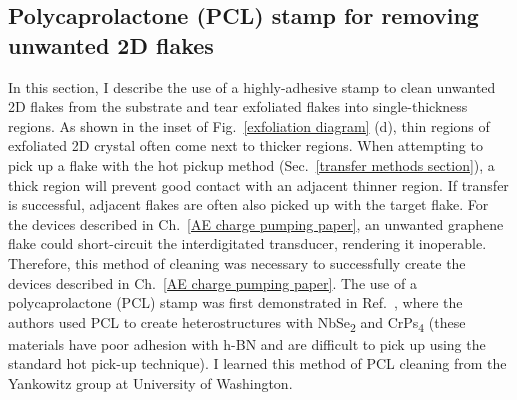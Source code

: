 \documentclass{beavtex_dub_edit}
\begin{document}
\begin{center}

    \linespread{1.0}\selectfont

\end{center}




\subsection{Polycaprolactone (PCL) stamp for removing unwanted 2D flakes}
In this section, I describe the use of a highly-adhesive stamp to clean unwanted 2D flakes from the substrate and tear exfoliated flakes into single-thickness regions. As shown in the inset of Fig.\ \ref{exfoliation diagram} (d), thin regions of exfoliated 2D crystal often come next to thicker regions. When attempting to pick up a flake with the hot pickup method (Sec.\ \ref{transfer methods section}), a thick region will prevent good contact with an adjacent thinner region. If transfer is successful, adjacent flakes are often also picked up with the target flake. For the devices described in Ch.\ \ref{AE charge pumping paper}, an unwanted graphene flake could short-circuit the interdigitated transducer, rendering it inoperable. Therefore, this method of cleaning was necessary to successfully create the devices described in Ch.\ \ref{AE charge pumping paper}. The use of a polycaprolactone (PCL) stamp was first demonstrated in Ref.\ \cite{son_strongly_2020}, where the authors used PCL to create heterostructures with NbSe\textsubscript{2} and CrPs\textsubscript{4} (these materials have poor adhesion with h-BN and are difficult to pick up using the standard hot pick-up technique). I learned this method of PCL cleaning from the Yankowitz group at University of Washington. 
\end{document}
